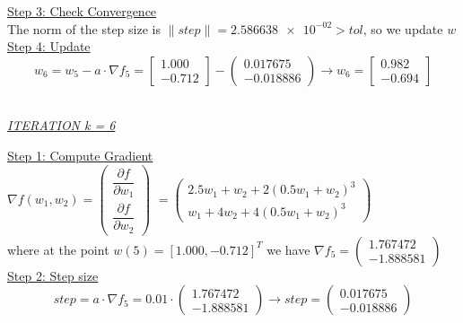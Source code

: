 \underline{Step 3: Check Convergence}\\
The norm of the step size is $\| step \| = \num{2.586638e-02} > tol$, so we update $w$
\\[4mm]

\underline{Step 4: Update}
\[ 
w_6 = w_5 - a\cdot \nabla f_5 =  \left[\begin{array}{c}
	1.000\\
	-0.712
\end{array}\right] - \left(\begin{array}{c}
0.017675 \\
-0.018886
\end{array}\right) \rightarrow
w_6 = \left[\begin{array}{c}
	0.982\\
	-0.694
\end{array}\right]
\]
\\[4mm]

\begin{center}
	\underline{\textit{ITERATION k = 6}}
\end{center}

\underline{Step 1: Compute Gradient}\\
\(\nabla f(w_1,w_2) = \left(\begin{array}{c}
	\dfrac{\partial f}{\partial w_1} \\[4mm]
	\dfrac{\partial f}{\partial w_2}
\end{array}\right)\) $= \left(\begin{array}{c}
	2.5w_1 + w_2 + 2(0.5w_1+w_2)^3\\[1mm]
	w_1 + 4w_2 + 4(0.5w_1+w_2)^3
\end{array}\right)$ \\[3mm]

where at the point $w\left(5\right) = \left[1.000, -0.712\right]^T$ we have $\nabla f_{5} = \left(\begin{array}{c}
	1.767472 \\
	-1.888581
\end{array}\right)$
\\[4mm]

\underline{Step 2: Step size}
\[
step = a \cdot \nabla f_{5} = 0.01 \cdot \left(\begin{array}{c}
	1.767472 \\
	-1.888581
\end{array}\right) \rightarrow step =\left(\begin{array}{c}
	0.017675 \\
	-0.018886
\end{array}\right)
\]
\\[4mm]

